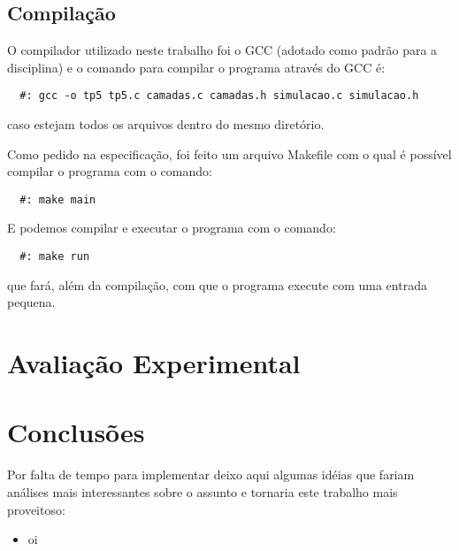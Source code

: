 \documentclass[12pt]{article}
\begin{document}
\subsection{Compilação}
O compilador utilizado neste trabalho foi o GCC (adotado como padrão para a disciplina) e 
o comando para compilar o programa através do GCC é:
\begin{verbatim}
  #: gcc -o tp5 tp5.c camadas.c camadas.h simulacao.c simulacao.h
\end{verbatim}
caso estejam todos os arquivos dentro do mesmo diretório.

Como pedido na especificação, foi feito um arquivo Makefile com o qual é possível compilar
o programa com o comando: 
\begin{verbatim}
  #: make main
\end{verbatim}

E podemos compilar e executar o programa com o comando:
\begin{verbatim}
  #: make run
\end{verbatim}
que fará, além da compilação, com que o programa execute com uma entrada pequena.

\section{Avaliação Experimental}
\label{avaliacao_experimental}


\section{Conclusões}
\label{conclusao}

Por falta de tempo para implementar deixo aqui algumas idéias que fariam análises mais interessantes sobre o assunto e tornaria este trabalho mais proveitoso:
\begin{itemize}
  \item oi
\end{itemize}
\end{document}
